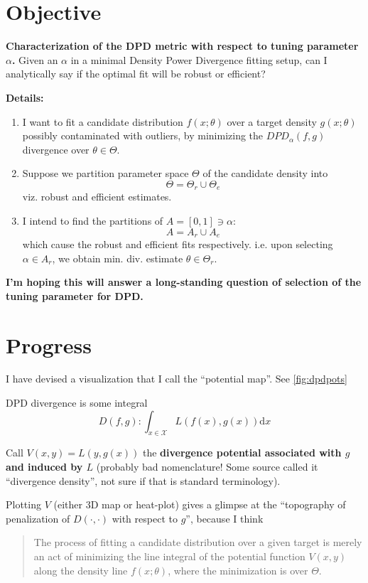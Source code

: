 \documentclass[a4paper]{article}
\renewcommand{\d}{\mathrm{d}}
\begin{document}
	
\section*{Objective}
\textbf{Characterization of the DPD metric with respect to tuning parameter $\alpha$.} Given an $\alpha$ in a minimal Density Power Divergence fitting setup, can I analytically say if the optimal fit will be robust or efficient?

\textbf{Details:}
\begin{enumerate}
	\item I want to fit a candidate distribution $f(x; \theta)$ over a target density $g(x; \theta)$ possibly contaminated with outliers, by minimizing the $DPD_\alpha(f, g)$ divergence over $\theta \in \Theta$.
	\item Suppose we partition parameter space $\Theta$ of the candidate density into
	\[\Theta = \Theta_r \cup \Theta_e\]
	viz. robust and efficient estimates.
	\item I intend to find the partitions of $A = [0,1] \ni \alpha$:
	\[A = A_r \cup A_e\]
	which cause the robust and efficient fits respectively. i.e. upon selecting $\alpha \in A_r$, we obtain min. div. estimate $\theta \in \Theta_r$.
\end{enumerate}

\textbf{I'm hoping this will answer a long-standing question of selection of the tuning parameter for DPD.}

\section*{Progress}
I have devised a visualization that I call the ``potential map''. See \autoref{fig:dpdpots}

DPD divergence is some integral
\[D(f,g): \int_{x \in \mathcal X} L(f(x),g(x)) \d x \]

Call $V(x,y) = L(y, g(x))$ the \textbf{divergence potential associated with $g$ and induced by $L$} (probably bad nomenclature! Some source called it ``divergence density'', not sure if that is standard terminology).

Plotting $V$ (either 3D map or heat-plot) gives a glimpse at the ``topography of penalization of $D(\cdot, \cdot)$ with respect to $g$'', because I think
\begin{quote}
	The process of fitting a candidate distribution over a given target is merely an act of minimizing the line integral of the potential function $V(x,y)$ along the density line $f(x; \theta)$, where the minimization is over $\Theta$.
\end{quote}
\end{document}
